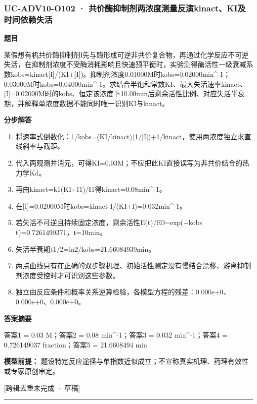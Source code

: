 \documentclass[UTF8,11pt,a4paper]{ctexart}
\begin{document}
\subsubsection*{UC-ADV10-O102 · 共价酶抑制剂两浓度测量反演kinact、KI及时间依赖失活}
\noindent\textbf{题目}\par
某假想有机共价酶抑制剂I先与酶形成可逆非共价复合物，再通过化学反应不可逆失活，在抑制剂浓度不受酶消耗影响且快速预平衡时，实验测得酶活性一级衰减系数kobs=kinact[I]/(KI+[I])。抑制剂浓度0.01000M时kobs=0.02000min\textasciicircum{}-1；0.03000M时kobs=0.04000min\textasciicircum{}-1。求结合半饱和常数KI、最大失活速率kinact、[I]=0.02000M时的kobs、恒定该浓度下10.00min后剩余活性比例、对应失活半衰期，并解释单浓度数据不能同时唯一识别KI与kinact。\par
\medskip\noindent\textbf{分步解答}
\begin{enumerate}
\item 将速率式倒数化：1/kobs=(KI/kinact)(1/[I])+1/kinact，使用两浓度独立求直线斜率与截距。
\item 代入两观测并消元，可得KI=0.03M；不应把此KI直接误写为非共价结合的热力学Kd。
\item 再由kinact=k1(KI+I1)/I1得kinact=0.08min\textasciicircum{}-1。
\item 在[I]=0.02000M时kobs=kinact I/(KI+I)=0.032min\textasciicircum{}-1。
\item 若失活不可逆且持续固定浓度，剩余活性E(t)/E0=exp(−kobs t)=0.7261490371，t=10min。
\item 失活半衰期t1/2=ln2/kobs=21.66084939min。
\item 两点曲线只有在正确的双步骤机理、初始活性测定没有慢结合漂移、游离抑制剂浓度受控时才可识别这些参数。
\item 独立由反应条件和概率关系逆算检验，各模型方程的残差：0.000e+0、0.000e+0、0.000e+0。
\end{enumerate}
\noindent\textbf{答案摘要}\par
答案1 = 0.03 M；答案2 = 0.08 min\textasciicircum{}-1；答案3 = 0.032 min\textasciicircum{}-1；答案4 = 0.726149037 fraction；答案5 = 21.6608494 min\par
\noindent\textbf{模型前提：}
题设特定反应途径与单指数近似成立；不宣称真实机理、药理有效性或专家原创审定。\par
\noindent\textcolor{red!65!black}{[跨辑去重未完成 · 草稿]} \par
\medskip\hrule\medskip
{}
\end{document}
